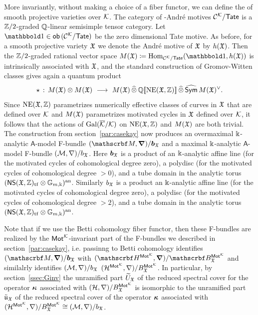 \documentclass[twoside,leqno]{article}
\numberwithin{equation}{section}
\theoremstyle{plain}
\theoremstyle{definition}
\begin{document}
More invariantly, without making a choice of a fiber functor, we can define the  of smooth projective varieties over $\mathcal K$. The category of \nc-Andr\'e motives $\mathcal{C}^{\mathcal K}/\mathsf{Tate}$ is a $\mathbb Z/2$-graded $\mathbb Q$-linear semisimple tensor category. Let $\triv \in \mathsf{ob} \, (\CA{\kay}/\mathsf{Tate})$
be the zero dimensional Tate motive. As before, for a smooth projective variety $\mathfrak X$ we denote the Andr\'{e} motive of $\mathfrak X$ by $h(\mathfrak X)$. Then the $\mathbb Z/2$-graded rational vector space $M(\fX) \coloneqq \op{Hom}_{\CA{\kay}/\mathsf{Tate}}(\triv,h(\fX))$ is intrinsically associated with $\mathfrak X$, and the standard construction of Gromov-Witten classes gives again a quantum product 
\[
\star \, : \, M(\mathfrak X)\otimes M(\mathfrak X) \ \longrightarrow \ M(\mathfrak X)\, \widehat{\otimes} \, \mathbb Q[\![\operatorname{NE}(\mathfrak X,\mathbb Z)]\!] \, \widehat{\otimes}\, \widehat{\mathsf{Sym}}\, M(\mathfrak X)^{\vee}. 
\]
Since $\operatorname{NE}(\mathfrak X,\mathbb Z)$ parametrizes numerically effective classes of curves in $\mathfrak X$ that are defined over $\mathcal K$ and $M(\mathfrak X)$ parametrizes motivated cycles in $\mathfrak X$ defined over $\mathcal K$, it follows that the actions of $\operatorname{Gal}(\overline{\mathcal K}/\mathcal K)$ on $\operatorname{NE}(\mathfrak X,\mathbb Z)$ and $M(\mathfrak X)$ are both trivial. The construction from section~\ref{par:casekay} now produces an overmaximal $\Bbbk$-analytic $\mathsf{A}$-model F-bundle  
$(\mycalb{M},\bnabla)/\boldsymbol{b}_{\fX}$ and a maximal $\Bbbk$-analytic $\mathsf{A}$-model F-bundle  
$(\mathcal{M},\nabla)/b_{\mathfrak X}$. Here $\boldsymbol{b}_{\mathfrak X}$ is a product of an $\Bbbk$-analytic affine line (for the motivated cycles of cohomological  degree zero), a  polydisc (for the motivated cycles of cohomological degree $>0$), and a tube domain in the analytic torus $(\mathsf{NS}(\mathfrak X,\mathbb Z)_{\operatorname{tf}}\otimes \mathbb G_{m,\Bbbk})^{\operatorname{an}}$.
Similarly $b_{\mathfrak X}$ is a product an $\Bbbk$-analytic affine line (for the motivated cycles of cohomological  degree zero), a  polydisc (for the motivated cycles of cohomological degree $>2$), and a tube domain in the analytic torus $(\mathsf{NS}(\mathfrak X,\mathbb Z)_{\operatorname{tf}}\otimes \mathbb G_{m,\Bbbk})^{\operatorname{an}}$.

Note that if we use the Betti cohomology fiber functor, then these F-bundles are realized by the $\mathsf{Mot}^{\mathcal K}$-invariant part of the F-bundles we described in section~\ref{par:casekay}, i.e. passinng to Betti cohomology identifies  
$(\mycalb{M},\bnabla)/\boldsymbol{b}_{\fX}$ with $(\omH^{\motM^{\kay}},\bnabla)/\omB_{\fX}^{\motM^{\kay}}$ and similalrly identifies  $(\mathcal{M},\nabla)/b_{\mathfrak X}$  
$(\mathcal H^{\mathsf{Mot}^{\mathcal K}},\nabla)/B_{\mathfrak X}^{\mathsf{Mot}^{\mathcal K}}$. In particular, by section~\ref{ssec:Ginv}  the unramified part $\widetilde U_{\mathfrak X}$  of the reduced spectral cover for the operator $\boldsymbol{\kappa}$ associated with  $(\mathcal H,\nabla)/B_{\mathfrak X}^{\mathsf{Mot}^{\mathcal K}}$ is isomorphic  to the unramified part $\tilde{\mathfrak{u}}_{\mathfrak X}$ of the reduced spectral cover of the operator $\boldsymbol{\kappa}$ associated with $(\mathcal H^{\mathsf{Mot}^{\mathcal K}},\nabla)/B_{\mathfrak X}^{\mathsf{Mot}^{\mathcal K}} \cong (\mathcal{M},\nabla)/b_{\mathfrak X}$. 
\end{document}
